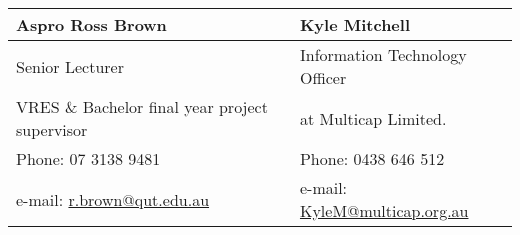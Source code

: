 \documentclass[a4paper,12pt]{article}
\begin{document}
{\begin{tabular}{ |p{8cm}||p{8cm}| }
	\hline
	\textbf{Aspro Ross Brown} & \textbf{Kyle Mitchell} \\ 
	\hline
	Senior Lecturer                       & Information Technology Officer \\
    VRES \& Bachelor final year project supervisor & at Multicap Limited. \\
	\hline
	Phone: 07 3138 9481 & Phone: 0438 646 512  \\ %
	\hline
	 e-mail: \href{mailto:r.brown@qut.edu.au}{r.brown@qut.edu.au} &
	 e-mail: \href{mailto:KyleM@multicap.org.au}{KyleM@multicap.org.au} \\
	\hline
\end{tabular}
\\ [4pc]
}
{}
{\label{magister}
\label{bachelor}
}{}
\end{document}
